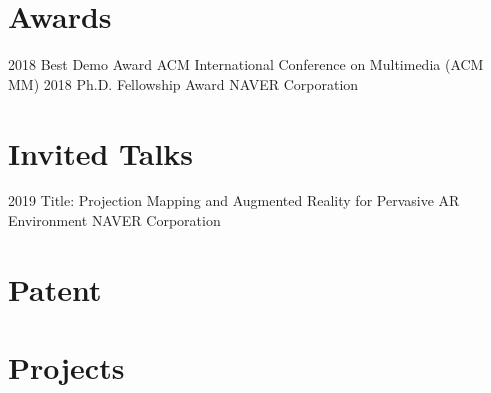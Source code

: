 \documentclass[]{friggeri-cv}
\begin{document}
\section{Awards}

\begin{entrylist}
  \entry
    {2018}
    {Best Demo Award}
    {}
    {ACM International Conference on Multimedia (ACM MM)}
\entry
    {2018}
    {Ph.D. Fellowship Award}
    {}
    {NAVER Corporation}
\end{entrylist}

\section{Invited Talks}

\begin{entrylist}
\entry
    {2019}
    {Title: Projection Mapping and Augmented Reality for Pervasive AR \\Environment}
    {}
    {NAVER Corporation}
\end{entrylist}

\section{Patent}

\begin{refsection}
  \nocite{*}
  \printbibliography[
    type=misc, 
    title=\textbf{Domestic (Korea)}, 
    heading=subbibliography,
    keyword={patent}
  ]
\end{refsection}

\section{Projects}
\end{document}
